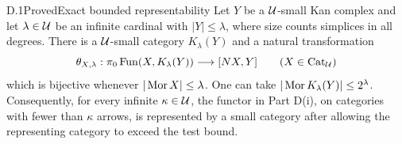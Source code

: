 
\begin{claim}{D.1}{Proved}{Exact bounded representability}
Let $Y$ be a $\mathcal U$-small Kan complex and let $\lambda\in\mathcal U$ be an infinite cardinal with $|Y|\leq\lambda$, where size counts simplices in all degrees. There is a $\mathcal U$-small category $K_\lambda(Y)$ and a natural transformation
\[
 \theta_{X,\lambda}:\pi_0\operatorname{Fun}(X,K_\lambda(Y))\longrightarrow[NX,Y]
 \qquad (X\in\mathrm{Cat}_\mathcal U)
\]
which is bijective whenever $|\operatorname{Mor} X|\leq\lambda$. One can take $|\operatorname{Mor} K_\lambda(Y)|\leq2^\lambda$. Consequently, for every infinite $\kappa\in\mathcal U$, the functor in Part D(i), on categories with fewer than $\kappa$ arrows, is represented by a small category after allowing the representing category to exceed the test bound.
\end{claim}
